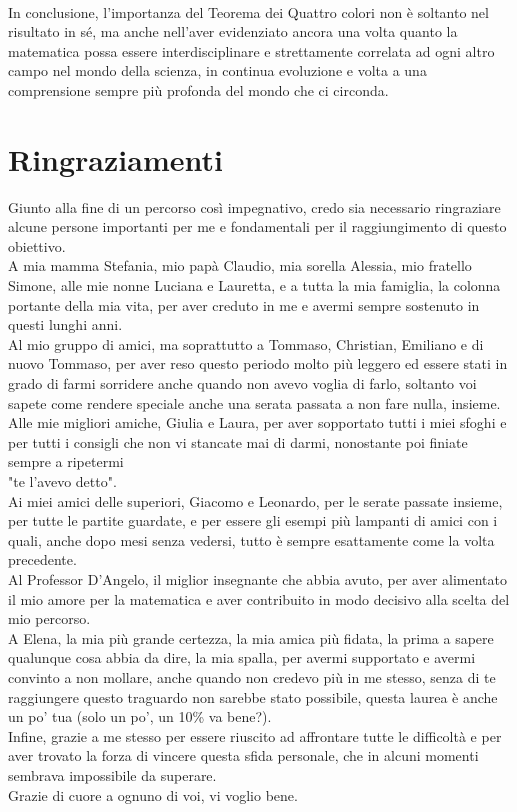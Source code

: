 \documentclass[a4paper,12pt,titlepage]{report}
\begin{document}
    \vspace{0.3cm}
    \\In conclusione, l'importanza del Teorema dei Quattro colori non è soltanto nel risultato in sé, ma anche nell'aver evidenziato ancora una volta quanto la matematica possa essere interdisciplinare e strettamente correlata ad ogni altro campo nel mondo della scienza, in continua evoluzione e volta a una comprensione sempre più profonda del mondo che ci circonda.
    
    \printbibliography[heading=bibintoc]
    
    \chapter*{Ringraziamenti}
    
    	Giunto alla fine di un percorso così impegnativo, credo sia necessario ringraziare alcune persone importanti per me e fondamentali per il raggiungimento di questo obiettivo.
    	\\A mia mamma Stefania, mio papà Claudio, mia sorella Alessia, mio fratello Simone, alle mie nonne Luciana e Lauretta, e a tutta la mia famiglia, la colonna portante della mia vita, per aver creduto in me e avermi sempre sostenuto in questi lunghi anni.
    	\\Al mio gruppo di amici, ma soprattutto a Tommaso, Christian, Emiliano e di nuovo Tommaso, per aver reso questo periodo molto più leggero ed essere stati in grado di farmi sorridere anche quando non avevo voglia di farlo, soltanto voi sapete come rendere speciale anche una serata passata a non fare nulla, insieme.
    	\\Alle mie migliori amiche, Giulia e Laura, per aver sopportato tutti i miei sfoghi e per tutti i consigli che non vi stancate mai di darmi, nonostante poi finiate sempre a ripetermi \\"te l'avevo detto".
    	\\Ai miei amici delle superiori, Giacomo e Leonardo, per le serate passate insieme, per tutte le partite guardate, e per essere gli esempi più lampanti di amici con i quali, anche dopo mesi senza vedersi, tutto è sempre esattamente come la volta precedente.
    	\\Al Professor D'Angelo, il miglior insegnante che abbia avuto, per aver alimentato il mio amore per la matematica e aver contribuito in modo decisivo alla scelta del mio percorso.
    	\\A Elena, la mia più grande certezza, la mia amica più fidata, la prima a sapere qualunque cosa abbia da dire, la mia spalla, per avermi supportato e avermi convinto a non mollare, anche quando non credevo più in me stesso, senza di te raggiungere questo traguardo non sarebbe stato possibile, questa laurea è anche un po' tua (solo un po', un 10\% va bene?).
    	\\Infine, grazie a me stesso per essere riuscito ad affrontare tutte le difficoltà e per aver trovato la forza di vincere questa sfida personale, che in alcuni momenti sembrava impossibile da superare.
    	\\Grazie di cuore a ognuno di voi, vi voglio bene.
    
\end{document}
